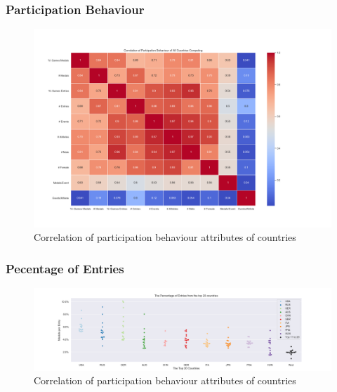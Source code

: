 \documentclass[a4 paper, 12pt]{article}
\begin{document}
        \subsubsection{Participation Behaviour}


        \begin{figure} [H]
            \centering
            \includegraphics[width=\textwidth, frame]
                {./images/graph/countries_stats_heatmap.png}      
                \caption{Correlation of participation behaviour attributes of countries } 
        \end{figure}


        \subsubsection{Pecentage of Entries}


        \begin{figure} [H]
            \centering
            \includegraphics[width=\textwidth, frame]
                {./images/graph/countries_entryperc_swarm.png}      
                \caption{Correlation of participation behaviour attributes of countries } 
        \end{figure}
\end{document}
